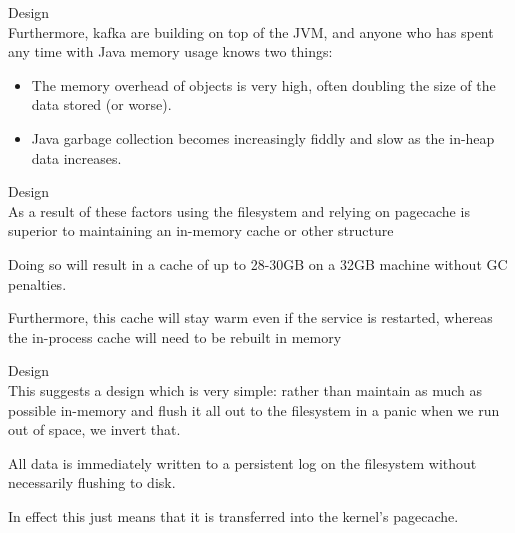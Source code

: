 \begin{frame}[plain,t]{Design} %
     \\
    \vspace{2ex}
    Furthermore, kafka are building on top of the JVM, and anyone who has spent any time with Java memory usage knows two things:
    \begin{itemize}
        \item The memory overhead of objects is very high, often doubling the size of the data stored (or worse).
        \item  Java garbage collection becomes increasingly fiddly and slow as the in-heap data increases.
    \end{itemize}
    
    
   
    
    
\end{frame}
\begin{frame}[plain,t]{Design} %
     \\
    \vspace{2ex}
    As a result of these factors using the filesystem and relying on pagecache is superior to maintaining an in-memory cache or other structure
    
    \vspace{2ex}
    Doing so will result in a cache of up to 28-30GB on a 32GB machine without GC penalties.
    
    \vspace{2ex}
    Furthermore, this cache will stay warm even if the service is restarted, whereas the in-process cache will need to be rebuilt in memory
    
    
    
\end{frame}
\begin{frame}[plain,t]{Design} %
     \\
    \vspace{2ex}
    This suggests a design which is very simple: rather than maintain as much as possible in-memory and flush it all out to the filesystem in a panic when we run out of space, we invert that. 
    
     \vspace{2ex}
    All data is immediately written to a persistent log on the filesystem without necessarily flushing to disk.
    
     \vspace{2ex}
     In effect this just means that it is transferred into the kernel's pagecache.
    
    
\end{frame}
